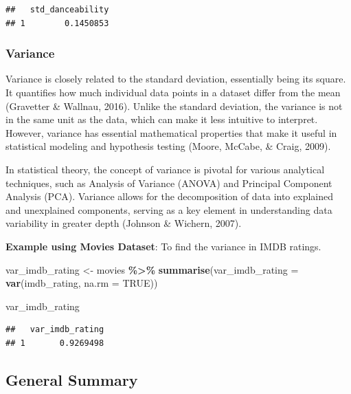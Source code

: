 \documentclass[
  b5paper]{book}
\newenvironment{Shaded}{\begin{snugshade}}{\end{snugshade}}
\newcommand{\AttributeTok}[1]{\textcolor[rgb]{0.13,0.29,0.53}{#1}}
\newcommand{\ConstantTok}[1]{\textcolor[rgb]{0.56,0.35,0.01}{#1}}
\newcommand{\FunctionTok}[1]{\textcolor[rgb]{0.13,0.29,0.53}{\textbf{#1}}}
\newcommand{\NormalTok}[1]{#1}
\newcommand{\OtherTok}[1]{\textcolor[rgb]{0.56,0.35,0.01}{#1}}
\newcommand{\SpecialCharTok}[1]{\textcolor[rgb]{0.81,0.36,0.00}{\textbf{#1}}}
\begin{document}
\begin{verbatim}
##   std_danceability
## 1        0.1450853
\end{verbatim}

\hypertarget{variance}{%
\subsubsection*{Variance}\label{variance}}

Variance is closely related to the standard deviation, essentially being its square. It quantifies how much individual data points in a dataset differ from the mean (Gravetter \& Wallnau, 2016). Unlike the standard deviation, the variance is not in the same unit as the data, which can make it less intuitive to interpret. However, variance has essential mathematical properties that make it useful in statistical modeling and hypothesis testing (Moore, McCabe, \& Craig, 2009).

In statistical theory, the concept of variance is pivotal for various analytical techniques, such as Analysis of Variance (ANOVA) and Principal Component Analysis (PCA). Variance allows for the decomposition of data into explained and unexplained components, serving as a key element in understanding data variability in greater depth (Johnson \& Wichern, 2007).

\textbf{Example using Movies Dataset}: To find the variance in IMDB ratings.

\begin{Shaded}
\begin{Highlighting}[]
\NormalTok{var\_imdb\_rating }\OtherTok{\textless{}{-}}\NormalTok{ movies }\SpecialCharTok{\%\textgreater{}\%} 
  \FunctionTok{summarise}\NormalTok{(}\AttributeTok{var\_imdb\_rating =} \FunctionTok{var}\NormalTok{(imdb\_rating, }\AttributeTok{na.rm =} \ConstantTok{TRUE}\NormalTok{))}

\NormalTok{var\_imdb\_rating}
\end{Highlighting}
\end{Shaded}

\begin{verbatim}
##   var_imdb_rating
## 1       0.9269498
\end{verbatim}

\hypertarget{general-summary}{%
\subsection*{General Summary}\label{general-summary}}
\end{document}
